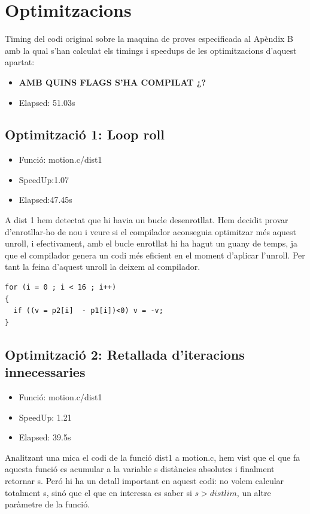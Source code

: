 

\chapter{Optimitzacions}

Timing del codi original sobre la maquina de proves especificada al Apèndix B amb la qual s'han calculat els timings i speedups de les optimitzacions d'aquest apartat:
\begin{itemize}
\item{\textbf{AMB QUINS FLAGS S'HA COMPILAT ¿?}}
\item{Elapsed: 51.03s}
\end{itemize}


\section{Optimitzaci\'o 1: Loop roll}
\begin{itemize}
\item{Funció: motion.c/dist1}
\item{SpeedUp:1.07}
\item{Elapsed:47.45s}
\end{itemize}

A dist 1 hem detectat que hi havia un bucle desenrotllat. Hem decidit provar d'enrotllar-ho de nou i veure si el compilador aconseguia optimitzar més aquest unroll, i efectivament, amb el bucle enrotllat hi ha hagut un guany de temps, ja que el compilador genera un codi més eficient en el moment d'aplicar l'unroll. Per tant la feina d'aquest unroll la deixem al compilador.

\begin{lstlisting}
for (i = 0 ; i < 16 ; i++)
{
  if ((v = p2[i]  - p1[i])<0) v = -v;
}
\end{lstlisting}
 
\section{Optimitzaci\'o 2: Retallada d'iteracions innecessaries}
\begin{itemize}
\item{Funció: motion.c/dist1}
\item{SpeedUp: 1.21}
\item{Elapsed: 39.5s}
\end{itemize}

Analitzant una mica el codi de la funció dist1 a motion.c, hem vist que el que fa aquesta funció es acumular a la variable s distàncies absolutes i finalment retornar s. Peró hi ha un detall important en aquest codi: no volem calcular totalment s, sinó que el que en interessa es saber si $s>distlim$, un altre paràmetre de la funció.

